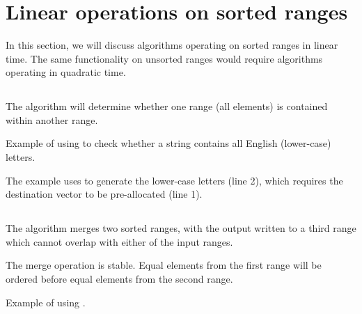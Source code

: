 \section{Linear operations on sorted ranges}

In this section, we will discuss algorithms operating on sorted ranges in linear time. The same functionality on unsorted ranges would require algorithms operating in quadratic time.

\subsection{\texorpdfstring{}{\texttt{std::includes}}}

The  algorithm will determine whether one range (all elements) is contained within another range.


\begin{box-note}
\footnotesize Example of using  to check whether a string contains all English (lower-case) letters.
\tcblower
{}
\end{box-note}

The example uses  to generate the lower-case letters (line 2), which requires the destination vector to be pre-allocated (line 1).

\subsection{\texorpdfstring{}{\texttt{std::merge}}}

The  algorithm merges two sorted ranges, with the output written to a third range which cannot overlap with either of the input ranges.


The merge operation is stable. Equal elements from the first range will be ordered before equal elements from the second range.

\begin{box-note}
\footnotesize Example of using .
\tcblower
{}
\end{box-note}

